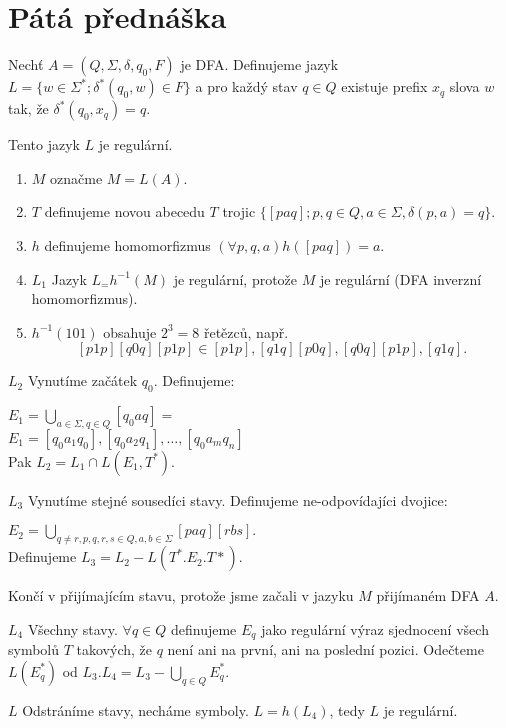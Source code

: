 \documentclass[../main.tex]{subfiles}
\begin{document}
\section{Pátá přednáška}

\begin{example}
    Nechť $A = (Q,\Sigma, \delta, q_0, F)$ je DFA. Definujeme jazyk $L = \{w \in \Sigma^*; \delta^*(q_0,w)\in F\}$
    a pro každý stav $q\in Q$ existuje prefix $x_q$ slova $w$ tak, že $\delta^*(q_0,x_q) = q$.

    Tento jazyk $L$ je regulární.

    \begin{enumerate}
        \item $M$ označme $M = L(A)$.
        \item $T$ definujeme novou abecedu $T$ trojic $\{[paq]; p,q \in Q, a \in \Sigma, \delta(p,a) = q\}$.
        \item $h$ definujeme homomorfizmus $(\forall p,q,a) h([paq]) = a$.
        \item $L_1$ Jazyk $L_ = h^{-1}(M)$ je regulární, protože $M$ je regulární (DFA inverzní homomorfizmus).
        \item $h^{-1}(101)$ obsahuje $2^3 = 8$ řetězců, např.
         \[[p1p][q0q][p1p] \in {[p1p],[q1q]}{[p0q],[q0q]}{[p1p],[q1q]}.\]
    \end{enumerate}
    $L_2$ Vynutíme začátek $q_0$. Definujeme:

    $E_1 = \bigcup_{a\in \Sigma, q\in Q}{[q_0aq]} = $\\
    $E_1 = {[q_0 a_1 q_0],[q_0 a_2 q_1],\dots,[q_0 a_m q_n]}$\\
    Pak $L_2 = L_1 \cap L(E_1,T^*)$.

    $L_3$ Vynutíme stejné sousedíci stavy. Definujeme ne-odpovídajíci dvojice:

    $E_2 = \bigcup_{q\neq r, p,q,r,s \in Q, a,b \in \Sigma}{[paq][rbs]}.$\\
    Definujeme $L_3 = L_2 - L(T^*.E_2.T*)$.

    Končí v přijímajícím stavu, protože jsme začali v jazyku $M$ přijímaném DFA $A$.
    
    $L_4$ Všechny stavy. $\forall q\in Q$ definujeme $E_q$ jako regulární výraz sjednocení všech symbolů
    $T$ takových, že $q$ není ani na první, ani na poslední pozici. Odečteme $L(E^*_q)$ od $L_3 . L_4 = L_3 - \bigcup_{q\in Q}{E^*_q}$.

    $L$ Odstráníme stavy, necháme symboly. $L = h(L_4)$, tedy $L$ je regulární.
\end{example}
\end{document}
